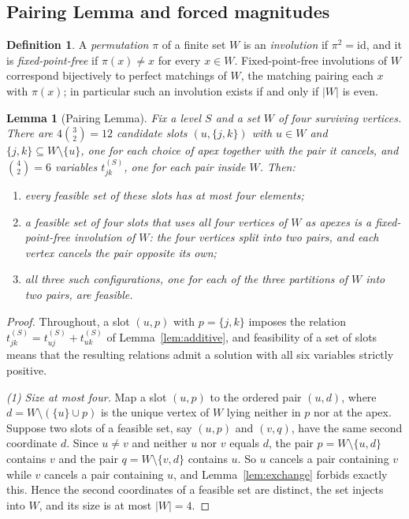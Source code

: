 \documentclass[11pt]{article}
\theoremstyle{plain}
\newtheorem{lemma}[theorem]{Lemma}
\theoremstyle{definition}
\newtheorem{definition}[theorem]{Definition}
\begin{document}
\begin{aiblock}
\subsection{Pairing Lemma and forced magnitudes}

\begin{definition}\label{def:involution}
    A \emph{permutation} $\pi$ of a finite set $W$ is an \emph{involution} if $\pi^2=\mathrm{id}$, and it is \emph{fixed-point-free} if $\pi(x)\neq x$ for every $x\in W$. Fixed-point-free involutions of $W$ correspond bijectively to perfect matchings of $W$, the matching pairing each $x$ with $\pi(x)$; in particular such an involution exists if and only if $|W|$ is even.

\end{definition}

\begin{lemma}[Pairing Lemma]\label{lem:pairing}
Fix a level $S$ and a set $W$ of four surviving vertices. There are $4\binom{3}{2}=12$ candidate slots
$(u,\{j,k\})$ with $u\in W$ and $\{j,k\}\subseteq W\setminus\{u\}$, one for each choice of apex together
with the pair it cancels, and $\binom{4}{2}=6$ variables $t^{(S)}_{jk}$, one for each pair inside $W$.
Then:
\begin{enumerate}
\item every feasible set of these slots has at most four elements;
\item a feasible set of four slots that uses all four vertices of $W$ as apexes is a fixed-point-free
      involution of $W$: the four vertices split into two pairs, and each vertex cancels the pair
      opposite its own;
\item all three such configurations, one for each of the three partitions of $W$ into two pairs, are
      feasible.
\end{enumerate}
\end{lemma}
\begin{proof}
Throughout, a slot $(u,p)$ with $p=\{j,k\}$ imposes the relation
$t^{(S)}_{jk}=t^{(S)}_{uj}+t^{(S)}_{uk}$ of Lemma~\ref{lem:additive}, and feasibility of a set of slots
means that the resulting relations admit a solution with all six variables strictly positive.

\emph{(1) Size at most four.} Map a slot $(u,p)$ to the ordered pair $(u,d)$, where
$d=W\setminus(\{u\}\cup p)$ is the unique vertex of $W$ lying neither in $p$ nor at the apex. Suppose
two slots of a feasible set, say $(u,p)$ and $(v,q)$, have the same second coordinate $d$. Since
$u\neq v$ and neither $u$ nor $v$ equals $d$, the pair $p=W\setminus\{u,d\}$ contains $v$ and the pair
$q=W\setminus\{v,d\}$ contains $u$. So $u$ cancels a pair containing $v$ while $v$ cancels a pair
containing $u$, and Lemma~\ref{lem:exchange} forbids exactly this. Hence the second coordinates of a
feasible set are distinct, the set injects into $W$, and its size is at most $|W|=4$.


\end{proof}
\end{aiblock}
\end{document}
